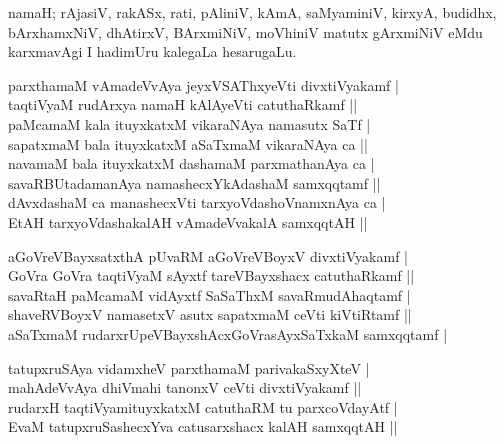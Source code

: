 \begin{entry}
{{namaH; rAjasiV, rakASx, rati, pAliniV, kAmA, saMyaminiV, kirxyA, budidhx,
bArxhamxNiV, dhAtirxV, BArxmiNiV, moVhiniV matutx gArxmiNiV eMdu karxma\-vAgi I
hadimUru kalegaLa hesarugaLu.}}
\smallskip
\begin{shl}
parxthamaM vAmadeVvAya jeyxVSAThxyeVti divxtiVyakamf |\\[1pt]
taqtiVyaM rudArxya namaH kAlAyeVti catuthaRkamf ||\\[1pt]
paMcamaM kala ituyxkatxM vikaraNAya namasutx SaTf |\\[1pt]
sapatxmaM bala ituyxkatxM aSaTxmaM vikaraNAya ca ||\\[1pt]
navamaM bala ituyxkatxM dashamaM parxmathanAya ca |\\[1pt]
savaRBUtadamanAya namashecxYkAdashaM samxqqtamf ||\\[1pt]
dAvxdashaM ca manashecxVti tarxyoVdashoVnamxnAya ca |\\[1pt]
EtAH tarxyoVdashakalAH vAmadeVvakalA samxqqtAH ||
\end{shl}
\medskip
{}
\smallskip
\begin{shl}
aGoVreVBayxsatxthA pUvaRM aGoVreVBoyxV divxtiVyakamf |\\[1pt]
GoVra GoVra taqtiVyaM sAyxtf tareVBayxshacx catuthaRkamf ||\\[1pt]
savaRtaH paMcamaM vidAyxtf SaSaThxM savaRmudAhaqtamf |\\[1pt]
shaveRVBoyxV namasetxV asutx sapatxmaM ceVti kiVtiRtamf ||\\[1pt]
aSaTxmaM rudarxrUpeVBayxshAcxGoVrasAyxSaTxkaM samxqqtamf |
\end{shl}
\medskip
{}
\smallskip
\begin{shl}
tatupxruSAya vidamxheV parxthamaM parivakaSxyXteV |\\[1pt]
mahAdeVvAya dhiVmahi tanonxV ceVti divxtiVyakamf ||\\[4pt]
rudarxH taqtiVyamituyxkatxM catuthaRM tu parxcoVdayAtf |\\[1pt]
EvaM tatupxruSashecxYva catusarxshacx kalAH samxqqtAH ||
\end{shl}
\medskip
{}
\end{entry}
